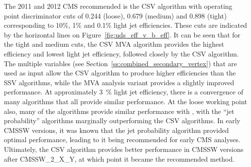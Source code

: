 The 2011 and 2012 CMS recommended \btagger is the CSV algorithm with operating point discriminator
cuts of 0.244 (loose), 0.679 (medium) and 0.898 (tight) corresponding to 10\%, 1\% and 0.1\% light jet
efficiencies. These cuts are indicated by the horizontal lines on Figure~\ref{fig:uds_eff_v_b_eff}. It can be
seen that for the tight and medium cuts, the CSV MVA algorithm provides the highest \bjet efficiency and
lowest light jet efficiency, followed closely by the CSV algorithm. The multiple variables (see
Section~\ref{ss:combined_secondary_vertex}) that are used as input allow the CSV algorithm to produce higher
efficiencies than the SSV algorithms, while the MVA analysis variant provides a slightly improved performance.
At approximately 3~\% light jet efficiency, there is a convergence of many algorithms that all provide similar
performance. At the loose working point also, many of the algorithms provide similar performance with \bjets,
with the ``jet probability'' algorithms marginally outperforming the CSV algorithms. In early CMSSW versions,
it was known that the jet probability algorithm provided optimal performance, leading to it being recommended
for early CMS analyses. Ultimately, the CSV algorithm provides better performance in CMSSW versions after
CMSSW\_2\_X\_Y, at which point it became the recommended \btagging method.
